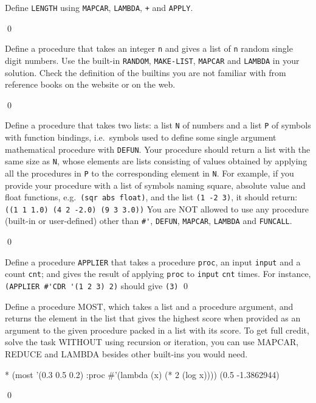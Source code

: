 \documentclass[a4paper,11pt]{article}
\begin{document}
\begin{uexercise}
Define \Verb+LENGTH+ using \Verb+MAPCAR+, \Verb+LAMBDA+, \Verb=+= and \Verb+APPLY+.

\qed
\end{uexercise}

\begin{uexercise}
\label{random-n} Define a procedure that takes an integer \Verb+n+ and gives a list of \Verb+n+ random single digit numbers. Use the built-in \Verb+RANDOM+, \Verb+MAKE-LIST+, \Verb+MAPCAR+ and \Verb+LAMBDA+ in your solution. Check the definition of the builtins you are not familiar with from reference books on the website or on the web.

\qed
\end{uexercise}

\begin{uexercise}
Define a procedure that takes two lists: a list \Verb+N+ of numbers and a list \Verb+P+ of symbols with function bindings, i.e.\ symbols used to define some single argument mathematical procedure with \Verb+DEFUN+. Your procedure should return a list with the same size as \Verb+N+, whose elements are lists consisting of values obtained by applying all the procedures in \Verb+P+ to the corresponding element in \Verb+N+. For example, if you provide your procedure with a list of symbols naming square, absolute value and float functions, e.g.\ \Verb+(sqr abs float)+, and the list \Verb+(1 -2 3)+, it should return: \Verb+((1 1 1.0) (4 2 -2.0) (9 3 3.0))+ You are NOT allowed to use any procedure (built-in or user-defined) other than \Verb+#'+, \Verb+DEFUN+, \Verb+MAPCAR+, \Verb+LAMBDA+ and \Verb+FUNCALL+.

\qed
\end{uexercise}

\begin{uexercise}

Define a procedure \Verb+APPLIER+ that takes a procedure \Verb+proc+, an input \Verb+input+ and a count \Verb+cnt+; and gives the result of applying \Verb+proc+ to \Verb+input+ \Verb+cnt+ times. For instance, \Verb+(APPLIER #'CDR '(1 2 3) 2)+ should give \Verb+(3)+
\qed
\end{uexercise}

\begin{uexercise}

Define a procedure MOST, which takes a list and a procedure argument, and returns the element in the list that gives the highest score when provided as an argument to the given procedure packed in a list with its score. To get full credit, solve the task WITHOUT using recursion or iteration, you can use MAPCAR, REDUCE and LAMBDA besides other built-ins you would need.

\begin{lispcode}
* (most '(0.3 0.5 0.2) :proc #'(lambda (x) (* 2 (log x))))
(0.5 -1.3862944)
\end{lispcode}

\qed
\end{uexercise}
\end{document}
